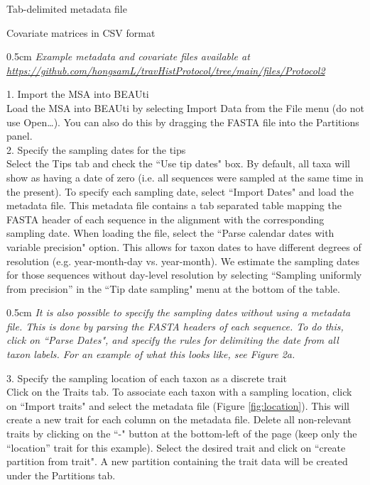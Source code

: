 \documentclass{article}
\newcommand{\ann}[1]{
\begin{adjustwidth}{0.5cm}{}
\it{#1}\\
\end{adjustwidth}}
\begin{document}
\hspace{0.5cm}Tab-delimited metadata file

\hspace{0.5cm}Covariate matrices in CSV format\\

\ann{Example metadata and covariate files available at\\
{\upshape\url{https://github.com/hongsamL/travHistProtocol/tree/main/files/Protocol2}}}

1. Import the MSA into BEAUti\\

Load the MSA into BEAUti by selecting Import Data from the File menu (do not use Open\ldots). You can also do this by dragging the FASTA file into the Partitions panel.\\

2. Specify the sampling dates for the tips\\

Select the Tips tab and check the ``Use tip dates" box. By default, all taxa will show as having a date of zero (i.e. all sequences were sampled at the same time in the present).
To specify each sampling date, select ``Import Dates" and load the metadata file. This metadata file contains a tab separated table mapping the FASTA header of each sequence in the alignment with the corresponding sampling date. When loading the file, select the ``Parse calendar dates with variable precision" option.
This allows for taxon dates to have different degrees of resolution (e.g. year-month-day vs. year-month). We estimate the sampling dates for those sequences without day-level resolution by selecting ``Sampling uniformly from precision'' in the ``Tip date sampling" menu at the bottom of the table. \\

\ann{It is also possible to specify the sampling dates without using a metadata file. This is done by parsing the FASTA headers of each sequence. To do this, click on ``Parse Dates", and specify the rules for delimiting the date from all taxon labels. For an example of what this looks like, see \cite{skyprot} Figure 2a.}

3. Specify the sampling location of each taxon as a discrete trait\\

Click on the Traits tab.
To associate each taxon with a sampling location, click on ``Import traits" and select the metadata file (Figure \ref{fig:location}).
This will create a new trait for each column on the metadata file. Delete all non-relevant traits by clicking on the ``-" button at the bottom-left of the page (keep only the ``location'' trait for this example). Select the desired trait and click on ``create partition from trait". A new partition containing the trait data will be created under the Partitions tab.\\
\end{document}
